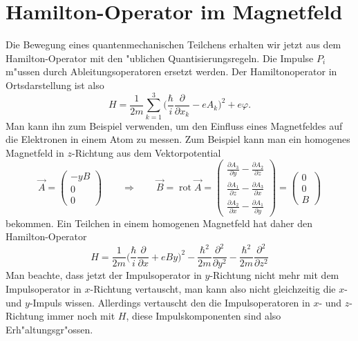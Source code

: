 \section{Hamilton-Operator im Magnetfeld}
Die Bewegung eines quantenmechanischen Teilchens erhalten wir jetzt
aus dem Hamilton-Operator mit den "ublichen Quantisierungsregeln.
Die Impulse $P_i$ m"ussen durch Ableitungsoperatoren ersetzt werden.
Der Hamiltonoperator in Ortsdarstellung ist also
\[
H=\frac1{2m}\sum_{k=1}^3\biggl(
\frac{\hbar}{i}
\frac{\partial}{\partial x_k}
-eA_k
\biggr)^2
+e\varphi.
\]
Man kann ihn zum Beispiel verwenden, um den Einfluss eines Magnetfeldes
auf die Elektronen in einem Atom zu messen.
Zum Beispiel kann man ein homogenes Magnetfeld in $z$-Richtung
aus dem Vektorpotential
\[
\vec A=\begin{pmatrix}
-yB\\0\\0
\end{pmatrix}
\qquad
\Rightarrow
\qquad
\vec B=\operatorname{rot}\vec A
=\begin{pmatrix}
\frac{\partial A_3}{\partial y}-\frac{\partial A_2}{\partial z}\\
\frac{\partial A_1}{\partial z}-\frac{\partial A_3}{\partial x}\\
\frac{\partial A_2}{\partial x}-\frac{\partial A_1}{\partial y}
\end{pmatrix}
=
\begin{pmatrix}
0\\0\\B
\end{pmatrix}
\]
bekommen.
Ein Teilchen in einem homogenen Magnetfeld hat daher den Hamilton-Operator
\[
H
=
\frac1{2m}\biggl(\frac{\hbar}{i}\frac{\partial}{\partial x}+eBy\biggr)^2
-\frac{\hbar^2}{2m}\frac{\partial^2}{\partial y^2}
-\frac{\hbar^2}{2m}\frac{\partial^2}{\partial z^2}
\]
Man beachte, dass jetzt der Impulsoperator in $y$-Richtung nicht mehr
mit dem Impulsoperator in $x$-Richtung vertauscht, man kann also
nicht gleichzeitig die $x$- und $y$-Impuls wissen.
Allerdings vertauscht den die Impulsoperatoren in $x$- und $z$-Richtung
immer noch mit $H$, diese Impulskomponenten sind also Erh"altungsgr"ossen.

